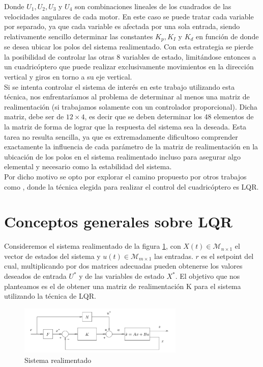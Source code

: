 \documentclass[main]{subfiles}
\begin{document}
Donde $U_1, U_2, U_3$ y $U_4$ son combinaciones lineales de los cuadrados de las velocidades angulares de cada motor. En este caso se puede tratar cada variable por separado, ya que cada variable es afectada por una sola entrada, siendo relativamente sencillo determinar las constantes $K_p, K_I$ y $K_d$ en funci\'on de donde se desea ubicar los polos del sistema realimentado. Con esta estrategia se pierde la posibilidad de controlar las otras 8 variables de estado, limit\'andose entonces a un cuadric\'optero que puede realizar exclusivamente movimientos en la direcci\'on vertical y giros en torno a su eje vertical.\\

Si se intenta controlar el sistema de inter\'es en este trabajo utilizando esta t\'ecnica, nos enfrentar\'iamos al problema de determinar al menos una matriz de realimentaci\'on (si trabajamos solamente con un controlador proporcional). Dicha matriz, debe ser de $12\times4$, es decir que se deben determinar los 48 elementos de la matriz de forma de lograr que la respuesta del sistema sea la deseada. Esta tarea no resulta sencilla, ya que es extremadamente dificultoso comprender exactamente la influencia de cada par\'ametro de la matriz de realimentaci\'on en la ubicaci\'on de los polos en el sistema realimentado incluso para asegurar algo elemental y necesario como la estabilidad del sistema.\\

Por dicho motivo se opto por explorar el camino propuesto por otros trabajos como \cite{bib:lqr-discreto}, donde la t\'ecnica elegida para realizar el control del cuadric\'optero es LQR.


\section{Conceptos generales sobre LQR}

Consideremos el sistema realimentado de la figura \ref{fig:bloque}, con $X(t)\in \mathcal{M}_{n\times1}$ el vector de estados del sistema y $u(t)\in \mathcal{M}_{m\times1}$ las entradas. $r$ es el setpoint del cual, multiplicando por dos matrices adecuadas pueden obtenerse los valores deseados de entrada $U^*$ y de las variables de estado $X^*$. El objetivo que nos planteamos es el de obtener una matriz de realimentaci\'on K para el sistema utilizando la t\'ecnica de LQR. 

\begin{figure}[h!]
	\centering
	\includegraphics[width=0.7\textwidth]{./pics_control/bloque.pdf}
	\caption{Sistema realimentado}
	\label{fig:bloque}
\end{figure}
 
\end{document}
